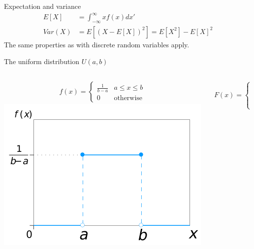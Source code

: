 \documentclass{beamer}
\begin{document}
\begin{frame}{Expectation and variance}
  \begin{align*}
    E[X] &= \int_{-\infty}^{\infty} xf(x)dx'\\
    Var(X) &= E[{(X - E[X])}^2] = E[X^2] - E[X]^2
  \end{align*}
  The same properties as with discrete random variables apply.
\end{frame}
\begin{frame}{The uniform distribution $U(a,b)$}
  \begin{columns}
    \begin{column}{0.5\textwidth}
      \begin{align*}
        f(x) =
        \begin{cases}
          \frac{1}{b - a} & a \leq x\leq b\\
          0 & \text{otherwise}
        \end{cases}
      \end{align*}
      \includegraphics[width=\linewidth]{uniform-pdf}
    \end{column}
    \begin{column}{0.5\textwidth}
      \begin{align*}
        F(x) =
        \begin{cases}
          0 & x < a\\
          \frac{x - a}{b - a} & a \leq b\\
          1 & x > b
        \end{cases}
      \end{align*}

\end{column}
\end{columns}
\end{frame}
\end{document}
